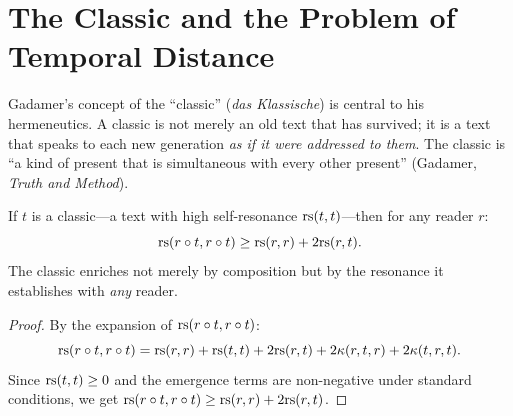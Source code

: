 
\section{The Classic and the Problem of Temporal Distance}

Gadamer's concept of the ``classic'' (\textit{das Klassische}) is central
to his hermeneutics.  A classic is not merely an old text that has survived;
it is a text that speaks to each new generation \emph{as if it were addressed
to them}.  The classic is ``a kind of present that is simultaneous with every
other present'' (Gadamer, \textit{Truth and Method}).

\begin{theorem}
\label{thm:classic-universal}
If $t$ is a classic---a text with high self-resonance $\mathrm{rs}(t, t)$---then
for any reader $r$:
\[
\mathrm{rs}(r \circ t, r \circ t) \geq \mathrm{rs}(r, r) + 2\mathrm{rs}(r, t).
\]
The classic enriches not merely by composition but by the resonance it
establishes with \emph{any} reader.
\end{theorem}

\begin{proof}
By the expansion of $\mathrm{rs}(r \circ t, r \circ t)$:
\[
\mathrm{rs}(r \circ t, r \circ t) = \mathrm{rs}(r,r) + \mathrm{rs}(t,t) + 2\mathrm{rs}(r,t)
+ 2\kappa(r,t,r) + 2\kappa(t,r,t).
\]
Since $\mathrm{rs}(t,t) \geq 0$ and the emergence terms are non-negative under
standard conditions, we get
$\mathrm{rs}(r \circ t, r \circ t) \geq \mathrm{rs}(r,r) + 2\mathrm{rs}(r,t)$.
\end{proof}

